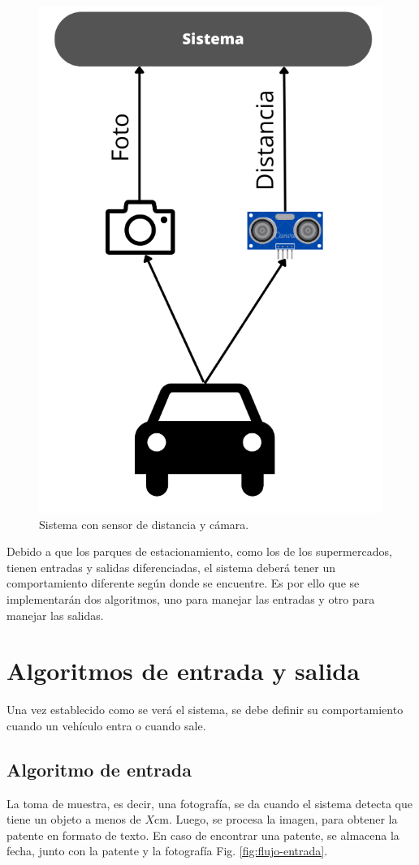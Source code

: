 \begin{figure}[bth]
    \centering
    \includegraphics[width=.3\textwidth]{imgs/sistema-con-sensor.png}
    \caption{Sistema con sensor de distancia y cámara.}
    \label{fig:sistema-completa}
\end{figure}

Debido a que los parques de estacionamiento, como los de los supermercados, tienen entradas y salidas diferenciadas, el sistema deberá tener un comportamiento diferente según donde se encuentre.
Es por ello que se implementarán dos algoritmos, uno para manejar las entradas y otro para manejar las salidas.

\section{Algoritmos de entrada y salida}

Una vez establecido como se verá el sistema, se debe definir su comportamiento cuando un vehículo entra o cuando sale.

\subsection{Algoritmo de entrada}

La toma de muestra, es decir, una fotografía, se da cuando el sistema detecta que tiene un objeto a menos de $X$cm. Luego, se procesa la imagen, para obtener la patente en formato de texto.
En caso de encontrar una patente, se almacena la fecha, junto con la patente y la fotografía Fig. \ref{fig:flujo-entrada}.

